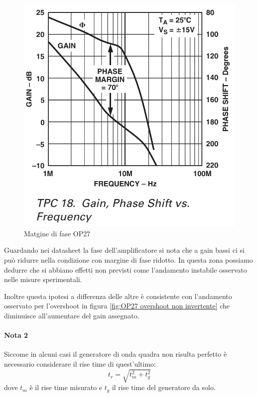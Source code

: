 

\begin{figure}[!h]
    \centering
    \includegraphics[width=0.3\linewidth]{analog/assets/OP27/OP27_Phase_Margin.png}
    \caption{Matgine di fase OP27}
\end{figure}

\begin{flushleft}
    

\colorbox{notebox}{
\begin{minipage}[]{\textwidth}
Guardando nei datasheet la fase dell'amplificatore si nota che a gain bassi ci si può ridurre nella condizione con margine di fase ridotto. In questa zona possiamo dedurre che si abbiano effetti non previsti come l'andamento instabile osservato nelle misure sperimentali.

Inoltre questa ipotesi a differenza delle altre è consistente con l'andamento osservato per l'overshoot in figura \ref{fig:OP27 overshoot non invertente} che diminuisce all'aumentare del gain assegnato.
\end{minipage}
}
\end{flushleft}
\paragraph{Nota 2}
Siccome in alcuni casi il generatore di onda quadra non risulta perfetto è necessario considerare il rise time di quest'ultimo:
\[t_r = \sqrt{t_m^2 + t_g^2}\]
dove $t_m$ è il rise time misurato e $t_g$ il rise time del generatore da solo.

\pagebreak

